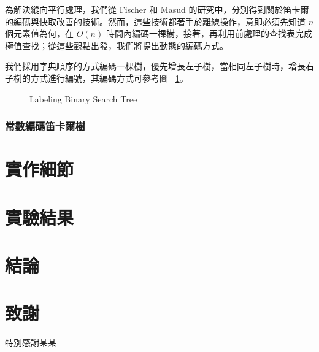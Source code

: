 \documentclass{gapd}
\begin{document}
為解決縱向平行處理，我們從 Fischer \cite{fischer} 和 Masud \cite{masud} 的研究中，分別得到關於笛卡爾的編碼與快取改善的技術。然而，這些技術都著手於離線操作，意即必須先知道 $n$ 個元素值為何，在 $O(n)$ 時間內編碼一棵樹，接著，再利用前處理的查找表完成極值查找；從這些觀點出發，我們將提出動態的編碼方式。

我們採用字典順序的方式編碼一棵樹，優先增長左子樹，當相同左子樹時，增長右子樹的方式進行編號，其編碼方式可參考圖 ~\ref{fig:lablingBST}。

\begin{figure}[!thb]
  
  
  
  \caption{Labeling Binary Search Tree}
  \label{fig:lablingBST}
\end{figure}


\subsubsection{常數編碼笛卡爾樹}


\section{實作細節}

\section{實驗結果}

\section{結論}
\label{sec:Conclusion}

\section*{致謝}

特別感謝某某
\end{document}
